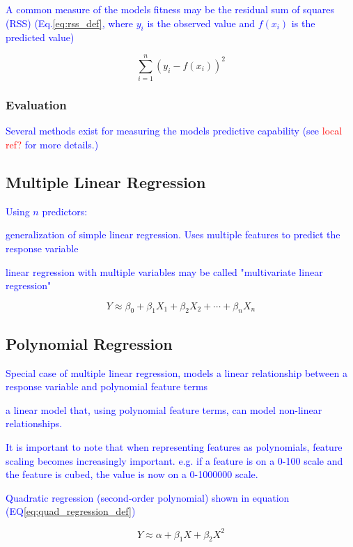 \textcolor{blue}{A common measure of the models fitness may be the {residual sum of squares (RSS)} (Eq.\ref{eq:rss_def}, where $y_i$ is the observed value and $f(x_i)$ is the predicted value)}

\begin{equation}
{\sum_{i=1}^{n}{(y_i - f(x_i))^2}}
\label{eq:rss_def}
\end{equation}


\subsubsection{Evaluation}

\textcolor{blue}{Several methods exist for measuring the models predictive capability (see \textcolor{red}{local ref?} for more details.)}


\subsection{Multiple Linear Regression}

\textcolor{blue}{Using $n$ predictors:}

\textcolor{blue}{generalization of simple linear regression. Uses multiple features to predict the response variable}

\textcolor{blue}{linear regression with multiple variables may be called "multivariate linear regression"}



\begin{equation}
{Y \approx \beta_0 + \beta_1 X_1 + \beta_2 X_2 + \cdots + \beta_n X_n}
\label{eq:mlr_ex}
\end{equation}


\subsection{Polynomial Regression}


\textcolor{blue}{Special case of multiple linear regression, models a linear relationship between a response variable and polynomial feature terms}

\textcolor{blue}{a linear model that, using polynomial feature terms, can model non-linear relationships.}

\textcolor{blue}{It is important to note that when representing features as polynomials, feature scaling becomes increasingly important. e.g. if a feature is on a 0-100 scale and the feature is cubed, the value is now on a 0-1000000 scale.}

\textcolor{blue}{Quadratic regression (second-order polynomial) shown in equation (EQ\ref{eq:quad_regression_def})}

\begin{equation}
{Y \approx \alpha + \beta_1 X + \beta_2 X^2}
\label{eq:quad_regression_def}
\end{equation}








